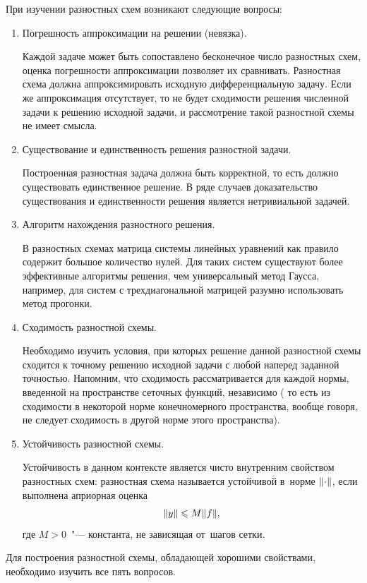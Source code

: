 \documentclass[11pt,a4paper,twoside,listtotoc,bibtotoc]{report}
\numberwithin{equation}{section}
\theoremstyle{definition}
\theoremstyle{plain}
\DeclarePairedDelimiter\norm{\lVert}{\rVert}
\begin{document}
При изучении разностных схем возникают следующие вопросы:
\begin{enumerate}
%
    \item
    Погрешность аппроксимации на решении (невязка).
    \label{item:approx}

    Каждой задаче может быть сопоставлено бесконечное число разностных схем,
    оценка погрешности аппроксимации позволяет их сравнивать. Разностная схема
    должна аппроксимировать исходную дифференциальную задачу. Если же аппроксимация
    отсутствует, то не будет сходимости решения численной задачи к решению исходной
    задачи, и рассмотрение такой разностной схемы не имеет смысла.
    \item
    Существование и единственность решения разностной задачи.
    \label{item:existance}

    Построенная разностная задача должна быть корректной, то есть
    должно существовать единственное решение.
    В ряде случаев доказательство существования и единственности решения является
    нетривиальной задачей.
    \item
    Алгоритм нахождения разностного решения.
    \label{item:algorithm}

    В разностных схемах матрица системы линейных уравнений как правило
    содержит большое количество нулей. Для таких систем существуют
    более эффективные алгоритмы решения, чем универсальный метод Гаусса,
    например, для систем с трехдиагональной матрицей разумно использовать
    метод прогонки.
    \item
    Сходимость разностной схемы.
    \label{item:convergence}

    Необходимо изучить условия, при которых решение данной разностной
    схемы сходится к точному решению исходной задачи с любой
    наперед заданной точностью. Напомним, что сходимость рассматривается
    для каждой нормы, введенной на пространстве сеточных функций, независимо (
    то есть из сходимости в некоторой норме конечномерного пространства,
    вообще говоря, не следует сходимость в другой норме этого пространства).
    \item
    Устойчивость разностной схемы.
    \label{item:robustness}

    Устойчивость в данном контексте является чисто внутренним свойством
    разностных схем: разностная схема называется
    устойчивой в~норме $\norm{\cdot}$, если выполнена априорная оценка
    $$
        \norm{y}\leqslant M\norm{f},
    $$
    где $M>0$~"--- константа, не зависящая от~шагов сетки.
%
\end{enumerate}
%
Для построения разностной схемы, обладающей хорошими свойствами,
необходимо изучить все пять вопросов.
\end{document}
